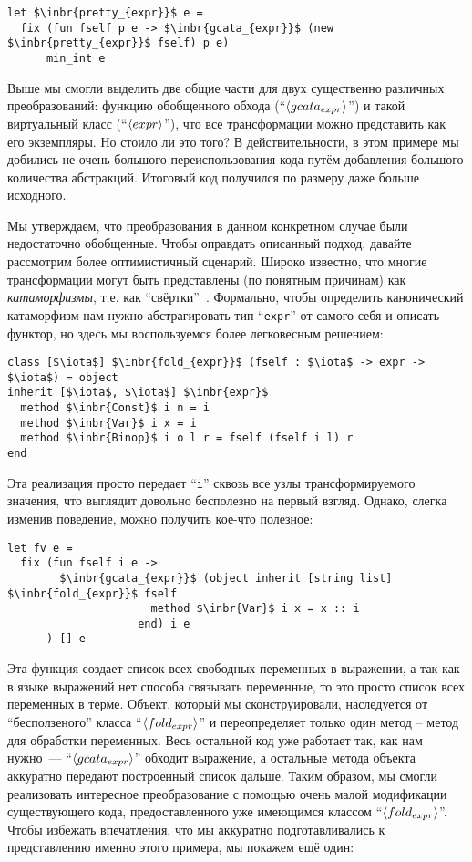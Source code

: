 \begin{lstlisting}
let $\inbr{pretty_{expr}}$ e =
  fix (fun fself p e -> $\inbr{gcata_{expr}}$ (new $\inbr{pretty_{expr}}$ fself) p e)
      min_int e
\end{lstlisting}

Выше мы смогли выделить две общие части для двух существенно различных преобразований: функцию обобщенного обхода
(``$\left<gcata_{expr}\right>$'') и такой виртуальный класс (``$\left<expr\right>$''), что все трансформации можно представить как его экземпляры.
Но стоило ли это того? В действительности, в этом примере мы добились не очень большого переиспользования кода путём добавления
большого количества абстракций. Итоговый код получился по размеру даже больше исходного.

Мы утверждаем, что преобразования в данном конкретном случае были недостаточно обобщенные. Чтобы оправдать описанный подход,
давайте рассмотрим более оптимистичный сценарий. Широко известно, что многие трансформации могут быть представлены 
(по понятным причинам) как \emph{катаморфизмы}, т.е. как ``свёртки''~\cite{Fold,Bananas,CalculatingFP}. 
Формально, чтобы определить канонический катаморфизм нам нужно абстрагировать тип ``\lstinline{expr}'' 
от самого себя и описать функтор, но здесь мы воспользуемся более легковесным решением:

\begin{lstlisting}
class [$\iota$] $\inbr{fold_{expr}}$ (fself : $\iota$ -> expr -> $\iota$) = object 
inherit [$\iota$, $\iota$] $\inbr{expr}$ 
  method $\inbr{Const}$ i n = i
  method $\inbr{Var}$ i x = i
  method $\inbr{Binop}$ i o l r = fself (fself i l) r
end
\end{lstlisting}

Эта реализация просто передает ``\lstinline{i}'' сквозь все узлы трансформируемого значения, что выглядит довольно бесполезно на первый взгляд.
Однако, слегка изменив поведение, можно получить кое-что полезное:

\begin{lstlisting}
let fv e =
  fix (fun fself i e ->
        $\inbr{gcata_{expr}}$ (object inherit [string list] $\inbr{fold_{expr}}$ fself
                      method $\inbr{Var}$ i x = x :: i
                    end) i e
      ) [] e
\end{lstlisting}

Эта функция создает список всех свободных переменных в выражении, а так как в языке выражений нет способа связывать переменные, 
то это просто список всех переменных в терме. Объект, который мы сконструировали, наследуется от ``бесползеного'' класса ``$\left<fold_{expr}\right>$'' и переопределяет только один метод -- метод для обработки переменных.
Весь остальной код уже работает так, как нам нужно~--- ``$\left<gcata_{expr}\right>$'' обходит выражение, 
а остальные метода объекта аккуратно передают построенный список дальше.
Таким образом, мы смогли реализовать интересное преобразование с помощью очень малой модификации существующего кода, 
предоставленного уже имеющимся классом ``$\left<fold_{expr}\right>$''. Чтобы избежать впечатления, что мы аккуратно подготавливались к
представлению именно этого примера, мы покажем ещё один:

